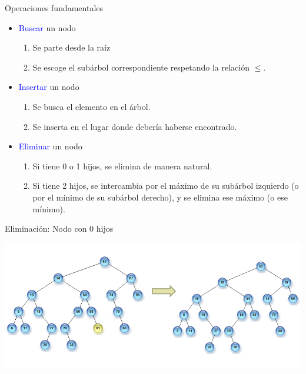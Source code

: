 \documentclass[handout]{beamer} %
\newcommand{\blue}[1]{\textcolor{blue}{#1}}
\begin{document}
\begin{frame}{Operaciones fundamentales}
    \begin{itemize}
        \item<1-> \blue{Buscar} un nodo
        \begin{enumerate}
            \item Se parte desde la raíz
            \item Se escoge el subárbol correspondiente respetando la relación $\leq$.
        \end{enumerate}
        \item<2-> \blue{Insertar} un nodo
        \begin{enumerate}
            \item Se busca el elemento en el árbol.
            \item Se inserta en el lugar donde debería haberse encontrado.\\[-1.5ex]
        \end{enumerate}
        \item<3-> \blue{Eliminar} un nodo\\[-1.5ex]
        \begin{enumerate}
            \item Si tiene 0 o 1 hijos, se elimina de manera natural.
            \item Si tiene 2 hijos, se intercambia por el máximo de su subárbol izquierdo (o por el mínimo de su subárbol derecho), y se elimina ese máximo (o ese mínimo).
        \end{enumerate}
    \end{itemize}
\end{frame}

\begin{frame}{Eliminación: Nodo con 0 hijos}
    \begin{center}
        \includegraphics[width=\textwidth]{./image/cap3/BST-delete-0child}
    \end{center}
\end{frame}
\end{document}
